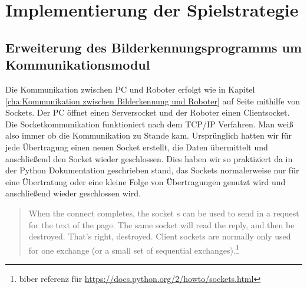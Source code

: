 
\chapter{Implementierung der Spielstrategie}
\section{Erweiterung des Bilderkennungsprogramms um Kommunikationsmodul}
Die Kommunikation zwischen PC und Roboter erfolgt wie in Kapitel \ref{cha:Kommunikation zwischen Bilderkennung und Roboter} auf Seite \pageref{cha:Kommunikation zwischen Bilderkennung und Roboter} mithilfe von Sockets. Der PC öffnet einen Serversocket und der Roboter einen Clientsocket. Die Socketkommunikation funktioniert nach dem TCP/IP Verfahren. Man weiß also immer ob die Kommunikation zu Stande kam.
Ursprünglich hatten wir für jede Übertragung einen neuen Socket erstellt, die Daten übermittelt und anschließend den Socket wieder geschlossen. Dies haben wir so praktiziert da in der Python Dokumentation geschrieben stand, das Sockets normalerweise nur für eine Übertratung oder eine kleine Folge von Übertragungen genutzt wird und anschließend wieder geschlossen wird.
\begin{quote}
{When the connect completes, the socket s can be used to send in a request for the text of the page. The same socket will read the reply, and then be destroyed. That’s right, destroyed. Client sockets are normally only used for one exchange (or a small set of sequential exchanges).\footnote{biber referenz für \url{https://docs.python.org/2/howto/sockets.html}}}
\end{quote}
